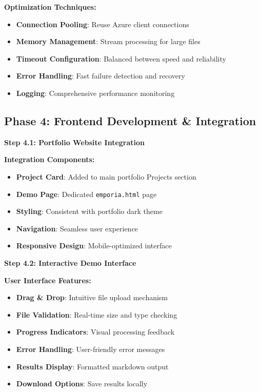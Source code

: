 \documentclass[11pt]{article}
\begin{document}
\begin{techbox}
\textbf{Optimization Techniques:}
\begin{itemize}
    \item \textbf{Connection Pooling}: Reuse Azure client connections
    \item \textbf{Memory Management}: Stream processing for large files
    \item \textbf{Timeout Configuration}: Balanced between speed and reliability
    \item \textbf{Error Handling}: Fast failure detection and recovery
    \item \textbf{Logging}: Comprehensive performance monitoring
\end{itemize}
\end{techbox}

\subsection*{Phase 4: Frontend Development \& Integration}

\begin{stepbox}
\textbf{Step 4.1: Portfolio Website Integration}
\end{stepbox}

\begin{techbox}
\textbf{Integration Components:}
\begin{itemize}
    \item \textbf{Project Card}: Added to main portfolio Projects section
    \item \textbf{Demo Page}: Dedicated \texttt{emporia.html} page
    \item \textbf{Styling}: Consistent with portfolio dark theme
    \item \textbf{Navigation}: Seamless user experience
    \item \textbf{Responsive Design}: Mobile-optimized interface
\end{itemize}
\end{techbox}

\begin{stepbox}
\textbf{Step 4.2: Interactive Demo Interface}
\end{stepbox}

\begin{techbox}
\textbf{User Interface Features:}
\begin{itemize}
    \item \textbf{Drag \& Drop}: Intuitive file upload mechanism
    \item \textbf{File Validation}: Real-time size and type checking
    \item \textbf{Progress Indicators}: Visual processing feedback
    \item \textbf{Error Handling}: User-friendly error messages
    \item \textbf{Results Display}: Formatted markdown output
    \item \textbf{Download Options}: Save results locally
\end{itemize}
\end{techbox}
\end{document}
